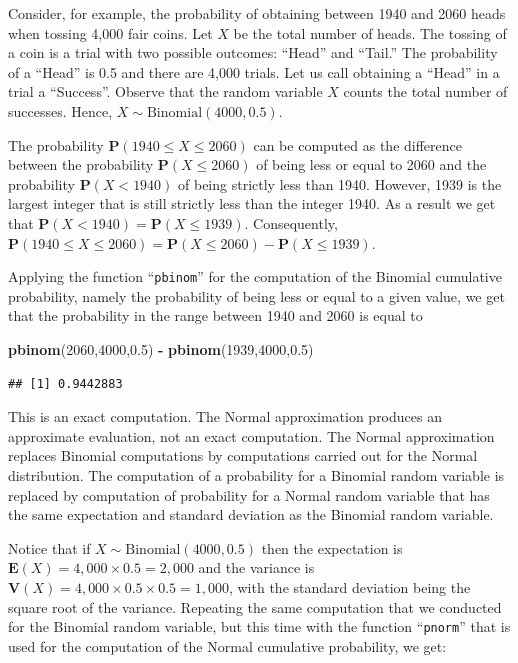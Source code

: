 \documentclass[]{krantz}
\makeatletter
\newenvironment{Shaded}{\begin{snugshade}}{\end{snugshade}}
\newcommand{\DecValTok}[1]{\textcolor[rgb]{0.00,0.00,0.81}{#1}}
\newcommand{\FloatTok}[1]{\textcolor[rgb]{0.00,0.00,0.81}{#1}}
\newcommand{\KeywordTok}[1]{\textcolor[rgb]{0.13,0.29,0.53}{\textbf{#1}}}
\newcommand{\NormalTok}[1]{#1}
\newcommand{\OperatorTok}[1]{\textcolor[rgb]{0.81,0.36,0.00}{\textbf{#1}}}
\newcommand{\StringTok}[1]{\textcolor[rgb]{0.31,0.60,0.02}{#1}}
\newcommand{\Expec}{\mathbf{E}}
\newcommand{\Prob}{\mathbf{P}}
\newcommand{\Var}{\mathbf{V}}
\newenvironment{kframe}{%
\medskip{}
\setlength{\fboxsep}{.8em}
 \def\at@end@of@kframe{}%
 \ifinner\ifhmode%
  \def\at@end@of@kframe{\end{minipage}}%
  \begin{minipage}{\columnwidth}%
 \fi\fi%
 \def\FrameCommand##1{\hskip\@totalleftmargin \hskip-\fboxsep
 \colorbox{shadecolor}{##1}\hskip-\fboxsep
     \hskip-\linewidth \hskip-\@totalleftmargin \hskip\columnwidth}%
 \MakeFramed {\advance\hsize-\width
   \@totalleftmargin\z@ \linewidth\hsize
   \@setminipage}}%
 {\par\unskip\endMakeFramed%
 \at@end@of@kframe}
\renewenvironment{Shaded}{\begin{kframe}}{\end{kframe}}
\theoremstyle{definition}
\theoremstyle{definition}
\theoremstyle{definition}
\theoremstyle{remark}
\makeatother
\begin{document}
Consider, for example, the probability of obtaining between 1940 and
2060 heads when tossing 4,000 fair coins. Let \(X\) be the total number of
heads. The tossing of a coin is a trial with two possible outcomes:
``Head'' and ``Tail.'' The probability of a ``Head'' is 0.5 and there are
4,000 trials. Let us call obtaining a ``Head'' in a trial a ``Success''.
Observe that the random variable \(X\) counts the total number of
successes. Hence, \(X \sim \mathrm{Binomial}(4000,0.5)\).

The probability \(\Prob(1940 \leq X \leq 2060)\) can be computed as the
difference between the probability \(\Prob(X \leq 2060)\) of being less or
equal to 2060 and the probability \(\Prob(X < 1940)\) of being strictly
less than 1940. However, 1939 is the largest integer that is still
strictly less than the integer 1940. As a result we get that
\(\Prob(X < 1940) = \Prob(X \leq 1939)\). Consequently,
\(\Prob(1940 \leq X \leq 2060) = \Prob(X \leq 2060) - \Prob(X \leq 1939)\).

Applying the function ``\texttt{pbinom}'' for the computation of the Binomial
cumulative probability, namely the probability of being less or equal to
a given value, we get that the probability in the range between 1940 and
2060 is equal to

\begin{Shaded}
\begin{Highlighting}[]
\KeywordTok{pbinom}\NormalTok{(}\DecValTok{2060}\NormalTok{,}\DecValTok{4000}\NormalTok{,}\FloatTok{0.5}\NormalTok{) }\OperatorTok{-}\StringTok{ }\KeywordTok{pbinom}\NormalTok{(}\DecValTok{1939}\NormalTok{,}\DecValTok{4000}\NormalTok{,}\FloatTok{0.5}\NormalTok{)}
\end{Highlighting}
\end{Shaded}

\begin{verbatim}
## [1] 0.9442883
\end{verbatim}

This is an exact computation. The Normal approximation produces an
approximate evaluation, not an exact computation. The Normal
approximation replaces Binomial computations by computations carried out
for the Normal distribution. The computation of a probability for a
Binomial random variable is replaced by computation of probability for a
Normal random variable that has the same expectation and standard
deviation as the Binomial random variable.

Notice that if \(X \sim \mathrm{Binomial}(4000,0.5)\) then the expectation
is \(\Expec(X) = 4,000 \times 0.5 = 2,000\) and the variance is
\(\Var(X) = 4,000 \times 0.5 \times 0.5 = 1,000\), with the standard
deviation being the square root of the variance. Repeating the same
computation that we conducted for the Binomial random variable, but this
time with the function ``\texttt{pnorm}'' that is used for the computation of the
Normal cumulative probability, we get:
\end{document}
